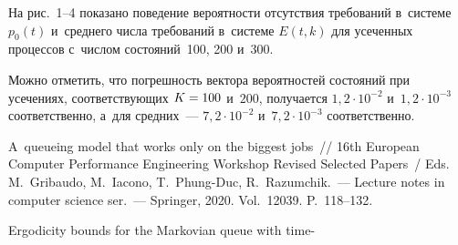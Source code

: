\begin{multicols}{2}

На рис.~1--4 показано поведение вероятности отсутствия требований в~системе~$p_0(t)$ и~среднего
 числа требований в~системе $E(t,k)$ для усеченных процессов с~числом состояний~100, 200 и~300. 

Можно  отметить, что погрешность вектора вероятностей состояний при усечениях, 
 соответствующих $K\hm=100$ и~$200$, получается $1{,}2\cdot10^{-2}$ и~$1{,}2\cdot10^{-3}$ 
 соответственно, а~для средних~--- $7{,}2\cdot10^{-2}$ и~$7{,}2\cdot 10^{-3}$ соответственно.
 
 



{\small\frenchspacing
{ %
\begin{thebibliography}{9}

\vspace*{-12pt}

 A~queueing model that works only on the biggest jobs~// 
16th European   Computer Performance Engineering Workshop Revised Selected Papers~/
Eds. M.~Gribaudo, M.~Iacono, T.~Phung-Duc, R.~Razumchik.~--- 
Lecture notes in computer science ser.~--- Springer, 2020. Vol.~12039. P.~118--132.

Ergodicity bounds for the Markovian queue with time-\linebreak\vspace*{-12pt}

\end{thebibliography}

}
}



\end{multicols}

\pagebreak

